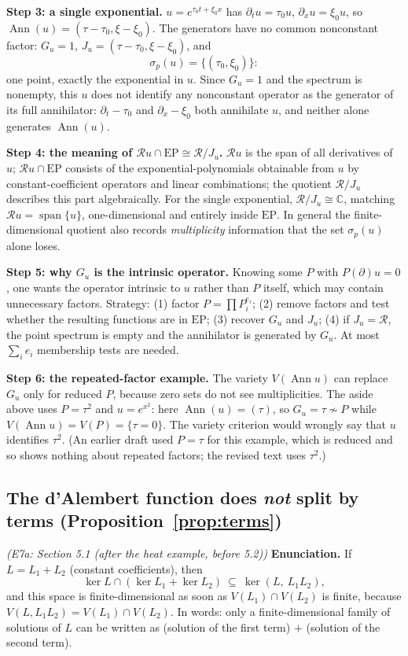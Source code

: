 \documentclass[11pt]{article}
\theoremstyle{plain}
\theoremstyle{definition}
\theoremstyle{remark}
\newcommand{\C}{\mathbb{C}}
\newcommand{\ring}{\mathcal{R}}            %
\DeclareMathOperator{\Ann}{Ann}             %
\DeclareMathOperator{\spn}{span}
\newcommand{\Var}{V}                        %
\newcommand{\EP}{\mathrm{EP}}               %
\begin{document}
\medskip\textbf{Step 3: a single exponential.} $u=e^{\tau_0t+\xi_0x}$ has $\partial_tu=\tau_0u$, $\partial_xu=\xi_0u$, so $\Ann(u)=(\tau-\tau_0,\xi-\xi_0)$. The generators have no common nonconstant factor: $G_u=1$, $J_u=(\tau-\tau_0,\xi-\xi_0)$, and
\[
\sigma_p(u)=\{(\tau_0,\xi_0)\}:
\]
one point, exactly the exponential in $u$. Since $G_u=1$ and the spectrum is nonempty, this $u$ does not identify any nonconstant operator as the generator of its full annihilator: $\partial_t-\tau_0$ and $\partial_x-\xi_0$ both annihilate $u$, and neither alone generates $\Ann(u)$.

\medskip\textbf{Step 4: the meaning of $\ring u\cap\EP\cong\ring/J_u$.} $\ring u$ is the span of all derivatives of $u$; $\ring u\cap\EP$ consists of the exponential-polynomials obtainable from $u$ by constant-coefficient operators and linear combinations; the quotient $\ring/J_u$ describes this part algebraically. For the single exponential, $\ring/J_u\cong\C$, matching $\ring u=\spn\{u\}$, one-dimensional and entirely inside $\EP$. In general the finite-dimensional quotient also records \emph{multiplicity} information that the set $\sigma_p(u)$ alone loses.

\medskip\textbf{Step 5: why $G_u$ is the intrinsic operator.} Knowing some $P$ with $P(\partial)u=0$, one wants the operator intrinsic to $u$ rather than $P$ itself, which may contain unnecessary factors. Strategy: (1) factor $P=\prod P_i^{e_i}$; (2) remove factors and test whether the resulting functions are in $\EP$; (3) recover $G_u$ and $J_u$; (4) if $J_u=\ring$, the point spectrum is empty and the annihilator is generated by $G_u$. At most $\sum_ie_i$ membership tests are needed.

\medskip\textbf{Step 6: the repeated-factor example.} The variety $\Var(\Ann u)$ can replace $G_u$ only for reduced $P$, because zero sets do not see multiplicities. The aside above uses $P=\tau^2$ and $u=e^{x^2}$: here $\Ann(u)=(\tau)$, so $G_u=\tau\not\sim P$ while $\Var(\Ann u)=\Var(P)=\{\tau=0\}$. The variety criterion would wrongly say that $u$ identifies $\tau^2$. (An earlier draft used $P=\tau$ for this example, which is reduced and so shows nothing about repeated factors; the revised text uses $\tau^2$.)

\subsection{The d'Alembert function does \emph{not} split by terms (Proposition~\ref{prop:terms})}\label{expl:E7a}
\noindent\emph{(E7a: Section 5.1 (after the heat example, before 5.2))}
\textbf{Enunciation.} If $L=L_1+L_2$ (constant coefficients), then
\[
\ker L\cap(\ker L_1+\ker L_2)\ \subseteq\ \ker(L,\ L_1L_2),
\]
and this space is finite-dimensional as soon as $\Var(L_1)\cap\Var(L_2)$ is finite, because $\Var(L,L_1L_2)=\Var(L_1)\cap\Var(L_2)$. In words: only a finite-dimensional family of solutions of $L$ can be written as (solution of the first term) $+$ (solution of the second term).
\end{document}
